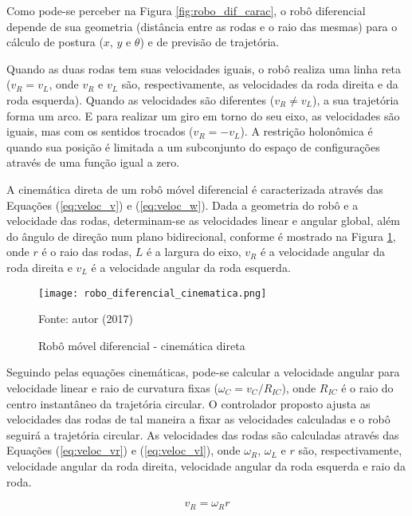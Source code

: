 Como pode-se perceber na Figura \ref{fig:robo_dif_carac}, o robô diferencial depende de sua geometria (distância entre as rodas e o raio das mesmas) para o cálculo de postura ($x$, $y$ e $\theta$) e de previsão de trajetória.
	
Quando as duas rodas tem suas velocidades iguais, o robô realiza uma linha reta ($v_R = v_L$, onde $v_R$ e $v_L$ são, respectivamente, as velocidades da roda direita e da roda esquerda). Quando as velocidades são diferentes ($v_R \neq v_L$), a sua trajetória forma um arco. E para realizar um giro em torno do seu eixo, as velocidades são iguais, mas com os sentidos trocados ($v_R = -v_L$). A restrição holonômica é quando sua posição é limitada a um subconjunto do espaço de configurações através de uma função igual a zero.

A cinemática direta de um robô móvel diferencial é caracterizada através das Equações (\ref{eq:veloc_v}) e (\ref{eq:veloc_w}). Dada a geometria do robô e a velocidade das rodas, determinam-se as velocidades linear e angular global, além do ângulo de direção num plano bidirecional, conforme é mostrado na Figura \ref{fig:robo_dif_cinematica}, onde $r$ é o raio das rodas, $L$ é a largura do eixo, $v_R$ é a velocidade angular da roda direita e $v_L$ é a velocidade angular da roda esquerda. 


\begin{figure}[!hb]
	\caption{\label{fig:robo_dif_cinematica}Robô móvel diferencial - cinemática direta}
	\begin{center}
		\texttt{[image: robo\_diferencial\_cinematica.png]}
	\end{center}
	\centering
	\small Fonte: autor (2017)
\end{figure}

Seguindo pelas equações cinemáticas, pode-se calcular a velocidade angular para velocidade linear e raio de curvatura fixas ($\omega_C = v_C/{R_{IC}}$), onde $R_{IC}$ é o raio do centro instantâneo da trajetória circular. O controlador proposto ajusta as velocidades das rodas de tal maneira a fixar as velocidades calculadas e o robô seguirá a trajetória circular. As velocidades das rodas são calculadas através das Equações (\ref{eq:veloc_vr}) e (\ref{eq:veloc_vl}), onde $\omega_R$, $\omega_L$ e $r$ são, respectivamente, velocidade angular da roda direita, velocidade angular da roda esquerda e raio da roda.


\begin{equation}
	\label{eq:veloc_vr}
	v_R = \omega_Rr
\end{equation}

